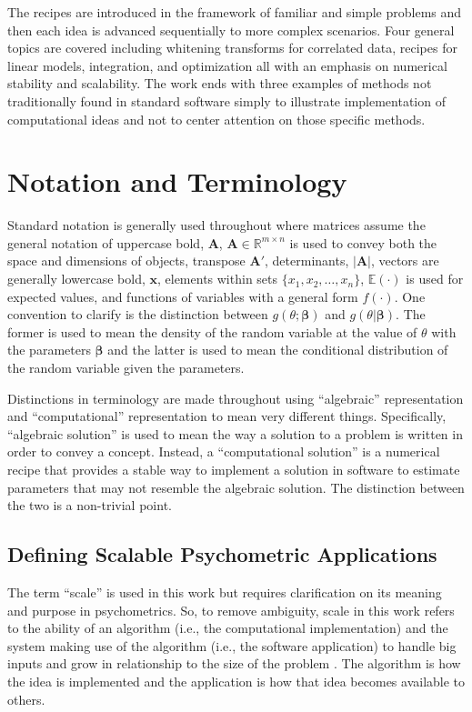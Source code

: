 \documentclass[12pt]{article}
\begin{document}
The recipes are introduced in the framework of familiar and simple problems and then each idea is advanced sequentially to more complex scenarios. Four general topics are covered including whitening transforms for correlated data, recipes for linear models, integration, and optimization all with an emphasis on numerical stability and scalability. The work ends with three examples of methods not traditionally found in standard software simply to illustrate implementation of computational ideas and not to center attention on those specific methods. 

\section*{Notation and Terminology} 

Standard notation is generally used throughout where matrices assume the general notation of uppercase bold, $\bm{A}$, $\bm{A} \in \mathbb{R}^{m \times n}$ is used to convey both the space and dimensions of objects, transpose $\bm{A}'$, determinants, $|\bm{A}|$, vectors are generally lowercase bold, $\bm{x}$, elements within sets $\{x_1, x_2, \ldots, x_n\}$, $\mathbb{E}(\cdot)$ is used for expected values, and functions of variables with a general form $f(\cdot)$. One convention to clarify is the distinction between $g(\theta;\bm{\beta})$ and $g(\theta|\bm{\beta})$. The former is used to mean the density of the random variable at the value of $\theta$ with the parameters $\bm{\beta}$ and the latter is used to mean the conditional distribution of the random variable given the parameters. 

Distinctions in terminology are made throughout using ``algebraic'' representation and ``computational'' representation to mean very different things. Specifically, ``algebraic solution'' is used to mean the way a solution to a problem is written in order to convey a concept. Instead, a ``computational solution'' is a numerical recipe that provides a stable way to implement a solution in software to estimate parameters that may not resemble the algebraic solution. The distinction between the two is a non-trivial point.                           

\subsection*{Defining Scalable Psychometric Applications}

The term ``scale'' is used in this work but requires clarification on its meaning and purpose in psychometrics. So, to remove ambiguity, scale in this work refers to the ability of an algorithm (i.e., the computational implementation) and the system making use of the algorithm (i.e., the software application) to handle big inputs and grow in relationship to the size of the problem \cite{teng}. The algorithm is how the idea is implemented and the application is how that idea becomes available to others.
\end{document}
